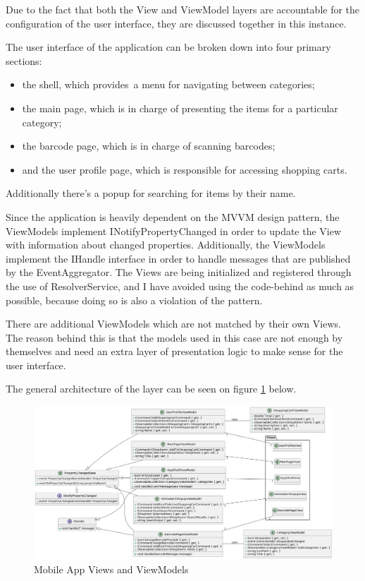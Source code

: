 Due to the fact that both the View and ViewModel layers are accountable for the configuration of the user interface, they are discussed together in this instance. 

The user interface of the application can be broken down into four primary sections: \begin{itemize}
	\item the shell, which provides a menu for navigating between categories;
	\item the main page, which is in charge of presenting the items for a particular category;
	\item the barcode page, which is in charge of scanning barcodes;
	\item  and the user profile page, which is responsible for accessing shopping carts.
\end{itemize} 
Additionally there's a popup for searching for items by their name.

Since the application is heavily dependent on the MVVM design pattern, the ViewModels implement INotifyPropertyChanged in order to update the View with information about changed properties. Additionally, the ViewModels implement the IHandle interface in order to handle messages that are published by the EventAggregator. The Views are being initialized and registered through the use of ResolverService, and I have avoided using the code-behind as much as possible, because doing so is also a violation of the pattern.

There are additional ViewModels which are not matched by their own Views. The reason behind this is that the models used in this case are not enough by themselves and need an extra layer of presentation logic to make sense for the user interface.

The general architecture of the layer can be seen on figure \ref{fig:appviewmodels} below.

\begin{figure}[H]
	\centering
	\includegraphics[width=1\linewidth]{img/app_viewmodels.png}
	\caption{Mobile App Views and ViewModels}
	\label{fig:appviewmodels}
\end{figure}

